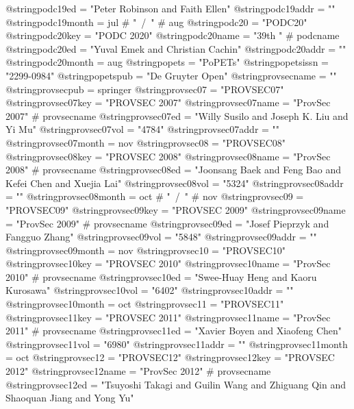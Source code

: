 @string{podc19ed =              "Peter Robinson and Faith Ellen"}
@string{podc19addr =            ""}
@string{podc19month =           jul # "~/~" # aug}
@string{podc20 =                "PODC20"}
@string{podc20key =             "PODC 2020"}
@string{podc20name =            "39th " # podcname}
@string{podc20ed =              "Yuval Emek and Christian Cachin"}
@string{podc20addr =            ""}
@string{podc20month =           aug}
@string{popets =                "{PoPETs}"}
@string{popetsissn =            "2299-0984"}
@string{popetspub =             "De Gruyter Open"}
@string{provsecname =           ""}
@string{provsecpub =            springer}
@string{provsec07 =             "PROVSEC07"}
@string{provsec07key =          "PROVSEC 2007"}
@string{provsec07name =         "ProvSec 2007" # provsecname}
@string{provsec07ed =           "Willy Susilo and Joseph K. Liu and Yi Mu"}
@string{provsec07vol =          "4784"}
@string{provsec07addr =         ""}
@string{provsec07month =        nov}
@string{provsec08 =             "PROVSEC08"}
@string{provsec08key =          "PROVSEC 2008"}
@string{provsec08name =         "ProvSec 2008" # provsecname}
@string{provsec08ed =           "Joonsang Baek and Feng Bao and Kefei Chen and Xuejia Lai"}
@string{provsec08vol =          "5324"}
@string{provsec08addr =         ""}
@string{provsec08month =        oct # "~/~" # nov}
@string{provsec09 =             "PROVSEC09"}
@string{provsec09key =          "PROVSEC 2009"}
@string{provsec09name =         "ProvSec 2009" # provsecname}
@string{provsec09ed =           "Josef Pieprzyk and Fangguo Zhang"}
@string{provsec09vol =          "5848"}
@string{provsec09addr =         ""}
@string{provsec09month =        nov}
@string{provsec10 =             "PROVSEC10"}
@string{provsec10key =          "PROVSEC 2010"}
@string{provsec10name =         "ProvSec 2010" # provsecname}
@string{provsec10ed =           "Swee-Huay Heng and Kaoru Kurosawa"}
@string{provsec10vol =          "6402"}
@string{provsec10addr =         ""}
@string{provsec10month =        oct}
@string{provsec11 =             "PROVSEC11"}
@string{provsec11key =          "PROVSEC 2011"}
@string{provsec11name =         "ProvSec 2011" # provsecname}
@string{provsec11ed =           "Xavier Boyen and Xiaofeng Chen"}
@string{provsec11vol =          "6980"}
@string{provsec11addr =         ""}
@string{provsec11month =        oct}
@string{provsec12 =             "PROVSEC12"}
@string{provsec12key =          "PROVSEC 2012"}
@string{provsec12name =         "ProvSec 2012" # provsecname}
@string{provsec12ed =           "Tsuyoshi Takagi and Guilin Wang and Zhiguang Qin and Shaoquan Jiang and Yong Yu"}
